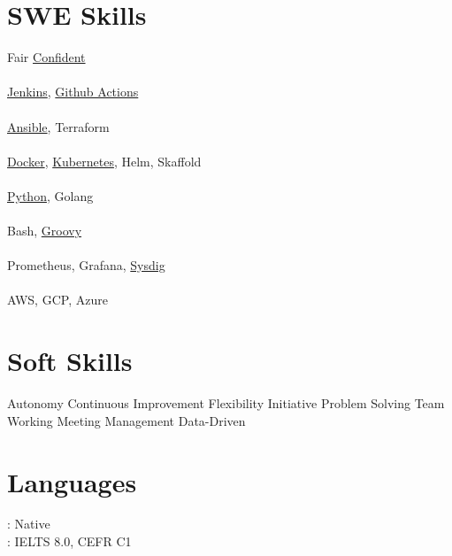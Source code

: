 \documentclass[]{deedy-resume-openfont}
\begin{document}
\begin{minipage}[t]{0.33\textwidth}

\section{SWE Skills}
Fair \textbullet{} \underline{Confident}\\
\vspace{\topsep} %
\\\underline{Jenkins}, \underline{Github Actions}\\
\\\underline{Ansible}, Terraform \\
\\\underline{Docker}, \underline{Kubernetes}, Helm, Skaffold \\
\\\underline{Python}, Golang \\
\\Bash, \underline{Groovy} \\
\\Prometheus, Grafana, \underline{Sysdig} \\
\\AWS, GCP, Azure \\

\section{Soft Skills}
Autonomy \textbullet{} Continuous Improvement \textbullet{} Flexibility \textbullet{}
Initiative \textbullet{} Problem Solving \textbullet{} Team Working \textbullet{} Meeting Management
\textbullet{} Data-Driven
\sectionsep
\section{Languages}
: Native\\
: IELTS 8.0, CEFR C1
\sectionsep

%
%

\end{minipage}
\vline
\hspace{0.01\textwidth}
\end{document}

